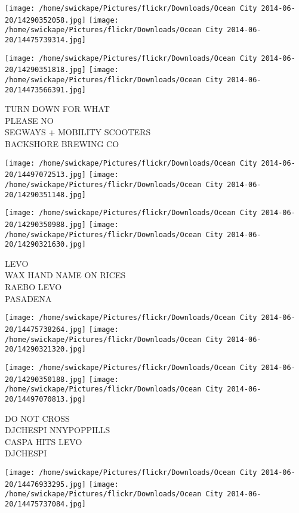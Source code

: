 \documentclass[10pt,letterpaper]{article}
\begin{document}
\texttt{[image: /home/swickape/Pictures/flickr/Downloads/Ocean City 2014-06-20/14290352058.jpg]}
\texttt{[image: /home/swickape/Pictures/flickr/Downloads/Ocean City 2014-06-20/14475739314.jpg]}

\texttt{[image: /home/swickape/Pictures/flickr/Downloads/Ocean City 2014-06-20/14290351818.jpg]}
\texttt{[image: /home/swickape/Pictures/flickr/Downloads/Ocean City 2014-06-20/14473566391.jpg]}

TURN DOWN FOR WHAT\\
PLEASE NO\\
SEGWAYS + MOBILITY SCOOTERS\\
BACKSHORE BREWING CO\\
\pagebreak

\texttt{[image: /home/swickape/Pictures/flickr/Downloads/Ocean City 2014-06-20/14497072513.jpg]}
\texttt{[image: /home/swickape/Pictures/flickr/Downloads/Ocean City 2014-06-20/14290351148.jpg]}

\texttt{[image: /home/swickape/Pictures/flickr/Downloads/Ocean City 2014-06-20/14290350988.jpg]}
\texttt{[image: /home/swickape/Pictures/flickr/Downloads/Ocean City 2014-06-20/14290321630.jpg]}

LEVO\\
WAX HAND NAME ON RICES\\
RAEBO LEVO\\
PASADENA\\
\pagebreak

\texttt{[image: /home/swickape/Pictures/flickr/Downloads/Ocean City 2014-06-20/14475738264.jpg]}
\texttt{[image: /home/swickape/Pictures/flickr/Downloads/Ocean City 2014-06-20/14290321320.jpg]}

\texttt{[image: /home/swickape/Pictures/flickr/Downloads/Ocean City 2014-06-20/14290350188.jpg]}
\texttt{[image: /home/swickape/Pictures/flickr/Downloads/Ocean City 2014-06-20/14497070813.jpg]}

DO NOT CROSS\\
DJCHESPI NNYPOPPILLS\\
CASPA HITS LEVO\\
DJCHESPI\\
\pagebreak

\texttt{[image: /home/swickape/Pictures/flickr/Downloads/Ocean City 2014-06-20/14476933295.jpg]}
\texttt{[image: /home/swickape/Pictures/flickr/Downloads/Ocean City 2014-06-20/14475737084.jpg]}
\end{document}
